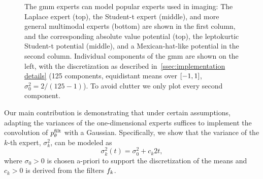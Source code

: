\begin{figure}
	\caption[Examples of potentials represented by Gaussian mixture experts]{%
		The \gls{gmm} experts can model popular experts used in imaging:
		The Laplace expert (top), the Student-t expert (middle), and more general multimodal experts (bottom) are shown in the first column, and the corresponding absolute value potential (top), the leptokurtic Student-t potential (middle), and a Mexican-hat-like potential in the second column.
		Individual components of the \gls{gmm} are shown on the left, with the discretization as described in~\cref{ssec:implementation details} (\num{125} components, equidistant means over \( \interval{\num{-1}}{\num{1}} \), \( \sigma_{\num{0}}^{\num{2}} = \num{2}/(\num{125}-\num{1}) \)).
		To avoid clutter we only plot every second component.
	}%
	\label{fig:parametrization examples}
\end{figure}

Our main contribution is demonstrating that under certain assumptions, adapting the variances of the one-dimensional experts suffices to implement the convolution of \( p^{\mathrm{filt}}_\theta \) with a Gaussian.
Specifically, we show that the variance of the \( k \)-th expert, \( \sigma_k^{\num{2}} \), can be modeled as
\begin{equation}
	\sigma_k^{\num{2}}(t) = \sigma_{\num{0}}^{\num{2}} + c_k \num{2}t,
	\label{eq:variances}
\end{equation}
where \( \sigma_{\num{0}} > \num{0} \) is chosen a-priori to support the discretization of the means and \( c_k > \num{0} \) is derived from the filters \( f_k \).

